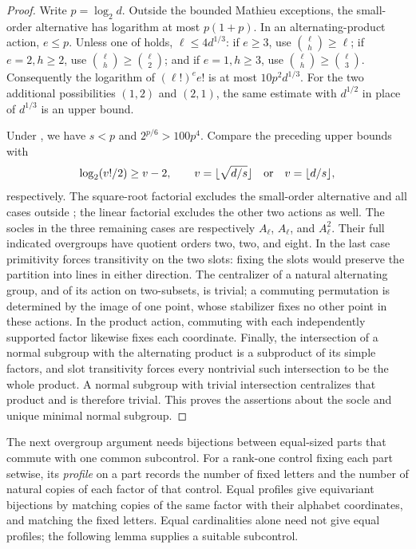 \begin{proof}
Write $p=\log_2d$.  Outside the bounded Mathieu exceptions, the small-order
alternative has logarithm at most $p(1+p)$.  In an alternating-product
action, $e\le p$.  Unless one of  holds,
$\ell\le4d^{1/3}$: if $e\ge3$, use $\binom\ell h\ge\ell$; if
$e=2,h\ge2$, use $\binom\ell h\ge\binom\ell2$; and if $e=1,h\ge3$,
use $\binom\ell h\ge\binom\ell3$.  Consequently the logarithm of
$(\ell!)^e e!$ is at most $10p^2d^{1/3}$.  For the two additional
possibilities $(1,2)$ and $(2,1)$, the same estimate with $d^{1/2}$ in
place of $d^{1/3}$ is an upper bound.

Under , we have $s<p$ and
$2^{p/6}>100p^4$.  Compare the preceding upper bounds with
\[
 \log_2(v!/2)\ge v-2,
 \qquad
 v=\lfloor\sqrt{d/s}\rfloor
 \quad\hbox{or}\quad v=\lfloor d/s\rfloor,
\]
respectively.  The square-root factorial excludes the small-order
alternative and all cases outside ; the linear
factorial excludes the other two actions as well.  The socles in the
three remaining cases are respectively $A_\ell$, $A_\ell$, and
$A_\ell^2$.  Their full indicated overgroups have quotient orders two,
two, and eight.  In the last case primitivity forces transitivity on
the two slots: fixing the slots would preserve the partition into
lines in either direction.  The centralizer of a natural alternating
group, and of its action on two-subsets, is trivial; a commuting
permutation is determined by the image of one point, whose stabilizer
fixes no other point in these actions.  In the product action,
commuting with each independently supported factor likewise fixes
each coordinate.  Finally, the intersection of a normal subgroup with the
alternating product is a subproduct of its simple factors, and slot
transitivity forces every nontrivial such intersection to be
the whole product.  A normal subgroup with trivial intersection
centralizes that product and is therefore trivial.  This proves the
assertions about the socle and unique minimal normal subgroup.
\end{proof}

The next overgroup argument needs bijections between equal-sized parts
that commute with one common subcontrol.  For a rank-one control fixing
each part setwise, its \emph{profile} on a part records the number of
fixed letters and the number of natural copies of each factor of that
control.  Equal profiles give equivariant bijections by matching copies
of the same factor with their alphabet coordinates, and matching the
fixed letters.  Equal cardinalities alone need not give equal profiles;
the following lemma supplies a suitable subcontrol.


